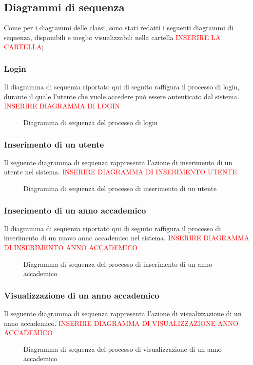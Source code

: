 	\subsection{Diagrammi di sequenza}
	Come per i diagrammi delle classi, sono stati redatti i seguenti diagrammi di sequenza, disponibili e meglio visualizzabili nella cartella {\textcolor{red}{INSERIRE LA CARTELLA}};
	
		\subsubsection{Login}
		Il diagramma di sequenza riportato qui di seguito raffigura il processo di login, durante il quale l'utente che vuole accedere può essere autenticato dal sistema.
		{\textcolor{red}{INSERIRE DIAGRAMMA DI LOGIN}}
		\begin{figure}[h]
			\centering
			\caption{Diagramma di sequenza del processo di login}
			\label{}
		\end{figure}
		
		\subsubsection{Inserimento di un utente}
		Il seguente diagramma di sequenza rappresenta l'azione di inserimento di un utente nel sistema.
		{\textcolor{red}{INSERIRE DIAGRAMMA DI INSERIMENTO UTENTE}}
		\begin{figure}[h]
			\centering
			\caption{Diagramma di sequenza del processo di inserimento di un utente}
			\label{}
		\end{figure}
		
		\subsubsection{Inserimento di un anno accademico}
		Il diagramma di sequenza riportato qui di seguito raffigura il processo di inserimento di un nuovo anno accademico nel sistema.
		{\textcolor{red}{INSERIRE DIAGRAMMA DI INSERIMENTO ANNO ACCADEMICO}}
		\begin{figure}[h]
			\centering
			\caption{Diagramma di sequenza del processo di inserimento di un anno accademico}
			\label{}
		\end{figure}
		
		\subsubsection{Visualizzazione di un anno accademico}
		Il seguente diagramma di sequenza rappresenta l'azione di visualizzazione di un anno accademico.
		{\textcolor{red}{INSERIRE DIAGRAMMA DI VISUALIZZAZIONE ANNO ACCADEMICO}}
		\begin{figure}[h]
			\centering
			\caption{Diagramma di sequenza del processo di visualizzazione di un anno accademico}
			\label{}
		\end{figure}
	
	
	
	
	